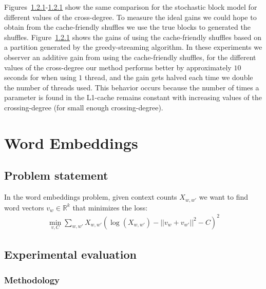 \documentclass[times,11pt]{article}
\numberwithin{equation}{section}		%
\numberwithin{figure}{section}			%
\numberwithin{table}{section}				%
\newcommand{\ltwonorm}[1]{\left|\left|{#1}\right|\right|}
\begin{document}
Figures~\ref{}-\ref{} show the same comparison for the stochastic block model for different values of the cross-degree. To measure the ideal gains we could hope to obtain from the 
cache-friendly shuffles we use the true blocks to generated the shuffles. Figure~\ref{} shows the gains of using the cache-friendly shuffles based on a partition generated by the greedy-streaming 
algorithm. In these experiments we observer an additive gain from using the cache-friendly shuffles, for the different values of the cross-degree our method performs better by approximately $10$ seconds for when using $1$ thread, and the gain gets halved each time we double the number of threads used. This behavior occurs because the number of times a parameter is found in the L1-cache remains constant with increasing values of the crossing-degree (for small enough crossing-degree). 

\section{Word Embeddings}\label{sec:w2v}

\subsection{Problem statement}
In the word embeddings problem, given context counts $X_{w,w'}$ we want to find word vectors
$v_{w} \in \mathbb{R}^{k}$ that minimizes the loss:
\begin{align*}
\min_{v,C}\sum_{w,w'}X_{w,w'} \left(\log(X_{w,w'}) - \ltwonorm{v_w+v_{w'}}^2 - C\right)^2
\end{align*}

\subsection{Experimental evaluation}
\subsubsection{Methodology}
\end{document}
